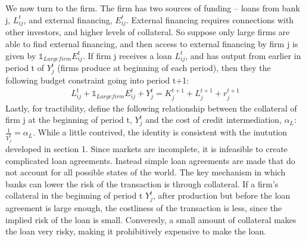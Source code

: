 \documentclass[letter,11pt]{article}
\begin{document}
We now turn to the firm. The firm has two sources of funding -- loans from bank j, $L_{ij}^t$, and external financing, $E_{ij}^t$. External financing requires connections with other investors, and higher levels of collateral. So suppose only large firms are able to find external financing, and then access to external financing by firm j is given by $\mathds{1}_{Large firm} E_{ij}^t$. If firm j receives a loan $L_{ij}^t$, and has output from earlier in period t of $Y_j^t$ (firms produce at beginning of each period), then they the following budget constraint going into period t+1:
\begin{align}
L_{ij}^t + \mathds{1}_{Large firm} E_{ij}^t + Y_j^t = K_j^{t+1} + L_j^{t+1} + r_j^{t+1}
\end{align}
Lastly, for tractibility, define the following relationship between the collateral of firm j at the beginning of period t, $Y_j^t$ and the cost of credit intermediation, $\alpha_L$: $\frac{1}{Y_j^t} = \alpha_L$. While a little contrived, the identity is consistent with the inutution developed in section 1. Since markets are incomplete, it is infeasible to create complicated loan agreements. Instead simple loan agreements are made that do not account for all possible states of the world. The key mechanism in which banks can lower the risk of the transaction is through collateral. If a firm's collateral in the beginning of period t $Y_j^t$, after production but before the loan agreement is large enough, the costliness of the transaction is less, since the implied risk of the loan is small. Converesly, a small amount of collateral makes the loan very risky, making it prohibitively expensive to make the loan.
\end{document}
